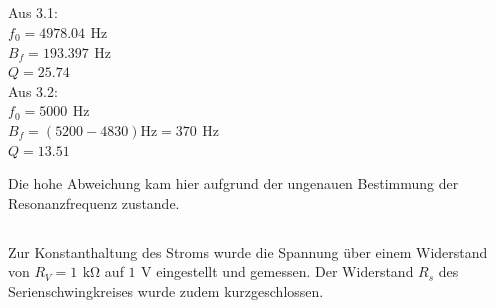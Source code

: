 \documentclass[a4paper, 12pt]{article}
\begin{document}
  \subsection{}


    \begin{center}
    Aus 3.1:\\
    \vspace{0.013155617496424828\paperheight}
    $f_0 = 4978.04 \,\ \si{\hertz}$\\
    $B_f = 193.397 \,\ \si{\hertz}$\\
    $Q = 25.74$\\
    \vspace{0.02128623625220817\paperheight}
    Aus 3.2:\\
    \vspace{0.013155617496424828\paperheight}
    $f_0 = 5000 \,\ \si{\hertz}$\\
    $B_f = (5200 - 4830) \si{\hertz} = 370 \,\ \si{\hertz}$\\
    $Q = 13.51$\\
    \end{center}

    Die hohe Abweichung kam hier aufgrund der ungenauen Bestimmung der Resonanzfrequenz zustande.

  \subsection{}
    Zur Konstanthaltung des Stroms wurde die Spannung über einem Widerstand von $R_V = 1 \,\ \si{\kilo\ohm}$ auf $1 \,\ \si{\volt}$ eingestellt und gemessen. Der Widerstand $R_s$ des Serienschwingkreises wurde zudem kurzgeschlossen.
\end{document}
